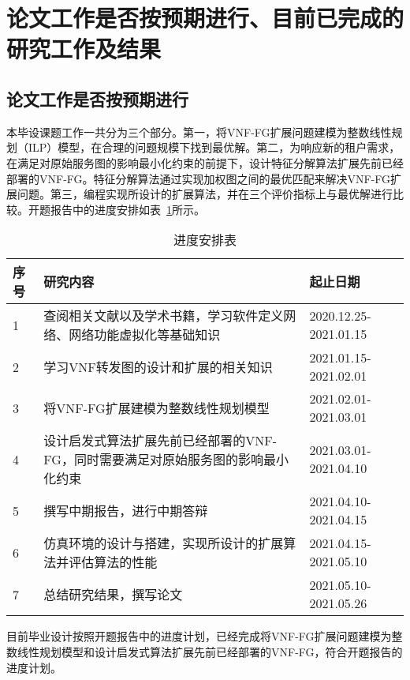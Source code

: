 \section{论文工作是否按预期进行、目前已完成的研究工作及结果}
\subsection{论文工作是否按预期进行}
本毕设课题工作一共分为三个部分。第一，将VNF-FG扩展问题建模为整数线性规划（ILP）模型，在合理的问题规模下找到最优解。第二，为响应新的租户需求，在满足对原始服务图的影响最小化约束的前提下，设计特征分解算法扩展先前已经部署的VNF-FG。特征分解算法通过实现加权图之间的最优匹配来解决VNF-FG扩展问题。第三，编程实现所设计的扩展算法，并在三个评价指标上与最优解进行比较。开题报告中的进度安排如表~\ref{table:1}所示。\par
\begin{table}[htbp]
    \centering
    \caption{进度安排表}
    \label{table:1}
    \begin{tabular}{p{40pt}p{230pt}p{130pt}}
        \toprule
        序号&研究内容&起止日期\\
        \midrule
        1	&查阅相关文献以及学术书籍，学习软件定义网络、网络功能虚拟化等基础知识	&2020.12.25-2021.01.15\\
        \midrule
        2	&学习VNF转发图的设计和扩展的相关知识	&2021.01.15-2021.02.01\\
        \midrule
        3	&将VNF-FG扩展建模为整数线性规划模型	&2021.02.01-2021.03.01\\
        \midrule
        4	&设计启发式算法扩展先前已经部署的VNF-FG，同时需要满足对原始服务图的影响最小化约束	&2021.03.01-2021.04.10\\
        \midrule
        5	&撰写中期报告，进行中期答辩	&2021.04.10-2021.04.15\\
        \midrule
        6	&仿真环境的设计与搭建，实现所设计的扩展算法并评估算法的性能	&2021.04.15-2021.05.10\\
        \midrule
        7	&总结研究结果，撰写论文	&2021.05.10-2021.05.26\\
        \bottomrule
    \end{tabular}
\end{table}

目前毕业设计按照开题报告中的进度计划，已经完成将VNF-FG扩展问题建模为整数线性规划模型和设计启发式算法扩展先前已经部署的VNF-FG，符合开题报告的进度计划。\par

